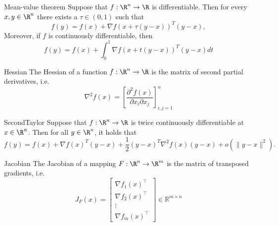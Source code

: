 \begin{lem}{Mean-value theorem}
    \vspace*{-0.1cm}
    Suppose that $f: \R^n \to \R$ is differentiable. Then for every $x,y \in \R^n$ there exists a $\tau \in (0,1)$ such that 
    \begin{equation*}
        f(y) = f(x) + {\nabla f(x + \tau(y - x))}^T (y - x),
    \end{equation*}
    Moreover, if $f$ is continuously differentiable, then 
    \begin{equation*}
        f(y) = f(x) + \int_0^1 {\nabla f(x + t(y - x))}^T (y - x) dt
    \end{equation*}
    \vspace*{-0.5cm}
\end{lem}

\begin{theo}[Hessian]{Hessian}
    \vspace*{-0.2cm}
    The Hessian of a function $f: \R^n \to \R$ is the matrix of second partial derivatives, i\@.e\@.
    \begin{equation*}
        \nabla^2 f(x) = \left[ \frac{\partial^2 f(x)}{\partial x_i \partial x_j} \right]_{i,j=1}^n
    \end{equation*}
    \vspace*{-0.5cm}
\end{theo}

\begin{theo}{SecondTaylor}
    Suppose that $f: \R^n \to \R$ is twice continuously differentiable at $x \in \R^n$. Then for all $y \in \R^n$, it holds that
    \begin{equation*}
        f(y) = f(x) + {\nabla {f(x)}}^T (y - x) + \frac{1}{2} {(y - x)}^T \nabla^2 f(x)(y-x) + o(\|y-x\|^2).
    \end{equation*}
    \vspace*{-0.4cm}
\end{theo}

\begin{theo}[Jacobian]{Jacobian}
    The Jacobian of a mapping $F: \R^n \to \R^m$ is the matrix of transposed gradients, i\@.e\@.
    \begin{equation*}
        J_F(x) = \begin{bmatrix}
            \nabla f_1(x)^\top \\
            \nabla f_2(x)^\top \\
            \vdots \\
            \nabla f_m(x)^\top
            \end{bmatrix}
            \in \mathbb{R}^{m \times n}
    \end{equation*}
    \vspace*{-0.4cm}
\end{theo}

